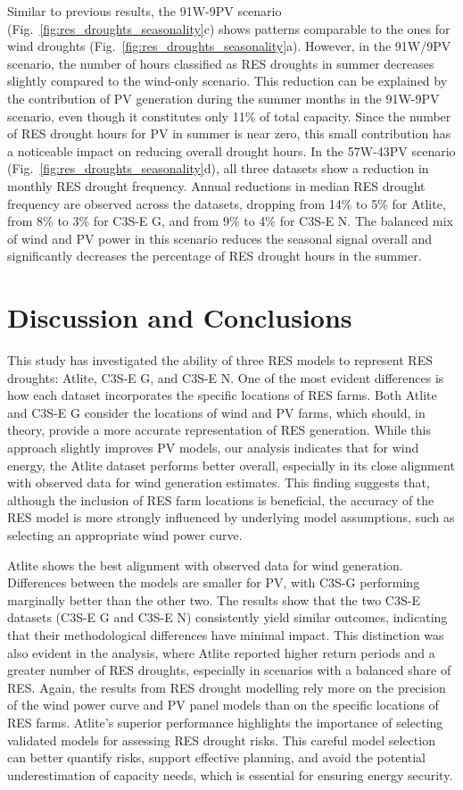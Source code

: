 \documentclass[preprint, 12pt]{elsarticle}
\begin{document}
Similar to previous results, the 91W-9PV scenario (Fig.~\ref{fig:res_droughts_seasonality}c) shows patterns comparable to the ones for wind droughts (Fig.~\ref{fig:res_droughts_seasonality}a). However, in the 91W/9PV scenario, the number of hours classified as RES droughts in summer decreases slightly compared to the wind-only scenario. This reduction can be explained by the contribution of PV generation during the summer months in the 91W-9PV scenario, even though it constitutes only 11\% of total capacity. Since the number of RES drought hours for PV in summer is near zero, this small contribution has a noticeable impact on reducing overall drought hours. In the 57W-43PV scenario (Fig.~\ref{fig:res_droughts_seasonality}d), all three datasets show a reduction in monthly RES drought frequency. Annual reductions in median RES drought frequency are observed across the datasets, dropping from 14\% to 5\% for Atlite, from 8\% to 3\% for C3S-E G, and from 9\% to 4\% for C3S-E N. The balanced mix of wind and PV power in this scenario reduces the seasonal signal overall and significantly decreases the percentage of RES drought hours in the summer.

\newpage
\section{Discussion and Conclusions}
\label{sec:Conclusion}

This study has investigated the ability of three RES models to represent RES droughts: Atlite, C3S-E G, and C3S-E N. One of the most evident differences is how each dataset incorporates the specific locations of RES farms. Both Atlite and C3S-E G consider the locations of wind and PV farms, which should, in theory, provide a more accurate representation of RES generation. While this approach slightly improves PV models, our analysis indicates that for wind energy, the Atlite dataset performs better overall, especially in its close alignment with observed data for wind generation estimates. This finding suggests that, although the inclusion of RES farm locations is beneficial, the accuracy of the RES model is more strongly influenced by underlying model assumptions, such as selecting an appropriate wind power curve.

Atlite shows the best alignment with observed data for wind generation. Differences between the models are smaller for PV, with C3S-G performing marginally better than the other two. The results show that the two C3S-E datasets (C3S-E G and C3S-E N) consistently yield similar outcomes, indicating that their methodological differences have minimal impact. This distinction was also evident in the analysis, where Atlite reported higher return periods and a greater number of RES droughts, especially in scenarios with a balanced share of RES. Again, the results from RES drought modelling rely more on the precision of the wind power curve and PV panel models than on the specific locations of RES farms. Atlite’s superior performance highlights the importance of selecting validated models for assessing RES drought risks. This careful model selection can better quantify risks, support effective planning, and avoid the potential underestimation of capacity needs, which is essential for ensuring energy security.
\end{document}
